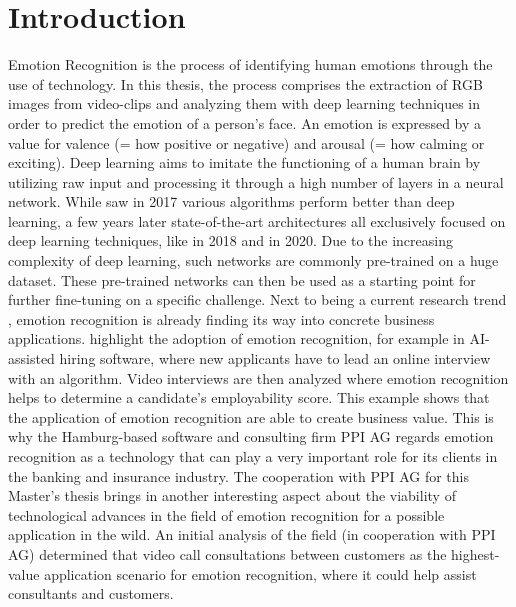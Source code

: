 
\chapter{Introduction}
Emotion Recognition is the process of identifying human emotions through the use of technology. In this thesis, the process comprises the extraction of RGB images from video-clips and analyzing them with deep learning techniques in order to predict the emotion of a person's face. An emotion is expressed by a value for valence (= how positive or negative) and arousal (= how calming or exciting). 
\newline\newline
Deep learning aims to imitate the functioning of a human brain by utilizing raw input and processing it through a high number of layers in a neural network. While \citet{Kossaifi:2017:AFEW-VADatabase} saw in 2017 various algorithms perform better than deep learning, a few years later state-of-the-art architectures all exclusively focused on deep learning techniques, like \citet{Theagarajan:2018:DeepDriver} in 2018 and \citet{Handrich:2020:SimultaneousPredVA} in 2020. Due to the increasing complexity of deep learning, such networks are commonly pre-trained on a huge dataset. These pre-trained networks can then be used as a starting point for further fine-tuning on a specific challenge.
\newline\newline
Next to being a current research trend \citep{Chen:2020:EmotionAI}  \citep{Handrich:2020:SimultaneousPredVA}, emotion recognition is already finding its way into concrete business applications. \citet{Chen:2020:EmotionAI} highlight the adoption of emotion recognition, for example in AI-assisted hiring software, where new applicants have to lead an online interview with an algorithm. Video interviews are then analyzed where emotion recognition helps to determine a candidate's employability score. This example shows that the application of emotion recognition are able to create business value.
\newline\newline
This is why the Hamburg-based software and consulting firm PPI AG regards emotion recognition as a technology that can play a very important role for its clients in the banking and insurance industry. The cooperation with PPI AG for this Master's thesis brings in another interesting aspect about the viability of technological advances in the field of emotion recognition for a possible application in the wild. An initial analysis of the field (in cooperation with PPI AG) determined that video call consultations between customers as the highest-value application scenario for emotion recognition, where it could help assist consultants and customers.
